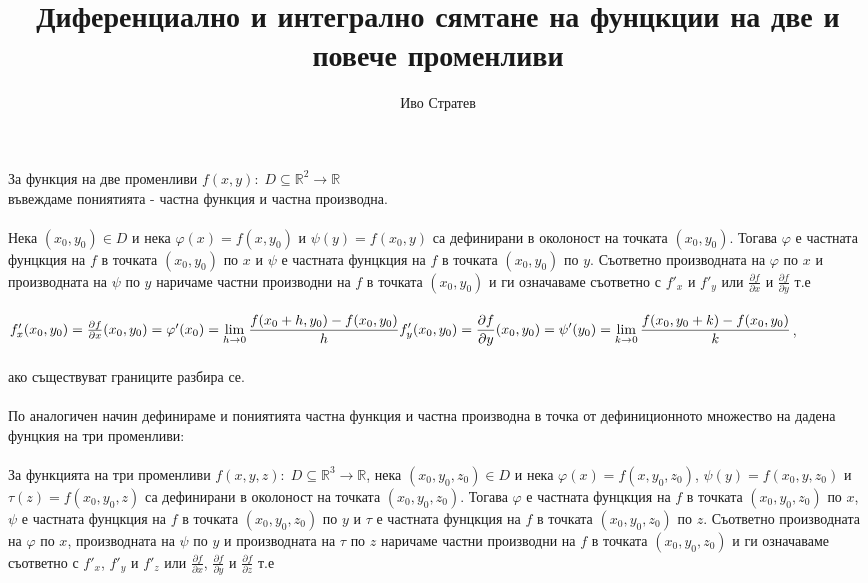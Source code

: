 \documentclass[14pt]{extarticle}
\title{Диференциално и интегрално сямтане на фунцкции на две и повече променливи}
\author{Иво Стратев}
\newcommand{\R}{\mathbb{R}}
\newcommand{\Lim}[2]{\displaystyle\lim_{#1 \to #2}}
\begin{document}
\maketitle
За функция на две променливи \(f(x, y) : \; D \subseteq \R^2 \to \R\) \\
въвеждаме пониятията - частна функция и частна производна. \\\\
Нека \((x_0, y_0) \in D\) и нека \(\varphi(x) = f(x, y_0)\) и \(\psi(y) = f(x_0, y)\) са дефинирани в околоност на точката \((x_0, y_0)\). Тогава \(\varphi\) е частната фунцкция на \(f\) в 
точката \((x_0, y_0)\) по \(x\) и \(\psi\) е частната фунцкция на \(f\) в точката \((x_0, y_0)\) по \(y\). Съответно производната на \(\varphi\) по \(x\) и
производната на \(\psi\) по \(y\) наричаме частни производни на \(f\) в точката \((x_0, y_0)\) и ги означаваме съответно с \(f'_x\) и \(f'_y\) или \(\frac{\partial f}{\partial x}\) и \(\frac{\partial f}{\partial y}\)  т.е \\\\
\(f'_x(x_0, y_0) = \frac{\partial f}{\partial x}(x_0, y_0) = \varphi'(x_0) = \Lim{h}{0} \frac{f(x_0 + h, y_0) - f(x_0, y_0)}{h} \\\\
f'_y(x_0, y_0) = \frac{\partial f}{\partial y}(x_0, y_0) = \psi'(y_0) = \Lim{k}{0} \frac{f(x_0, y_0 + k) - f(x_0, y_0)}{k} \), \\\\
ако съществуват границите разбира се. \\\\
По аналогичен начин дефинираме и пониятията частна функция и частна производна в точка от дефиниционното множество на дадена фунцкия на три променливи: \\\\
За функцията на три променливи \(f(x, y, z) : \; D \subseteq \R^3 \to \R\), 
нека \((x_0, y_0, z_0) \in D\) и нека \(\varphi(x) = f(x, y_0, z_0)\), \(\psi(y) = f(x_0, y, z_0)\) и \(\tau(z) = f(x_0, y_0, z)\)  са дефинирани в околоност на точката \((x_0, y_0, z_0)\). Тогава \(\varphi\) е частната фунцкция на \(f\) в 
точката \((x_0, y_0, z_0)\) по \(x\), \(\psi\) е частната фунцкция на \(f\) в точката \((x_0, y_0, z_0)\) по \(y\) и \(\tau\) е частната фунцкция на \(f\) в точката \((x_0, y_0, z_0)\) по \(z\). Съответно производната на \(\varphi\) по \(x\), производната на \(\psi\) по \(y\) и производната на \(\tau\) по \(z\) наричаме частни производни на \(f\) в точката \((x_0, y_0, z_0)\) и ги означаваме съответно с \(f'_x\), \(f'_y\) и \(f'_z\) или \(\frac{\partial f}{\partial x}\), \(\frac{\partial f}{\partial y}\) и \(\frac{\partial f}{\partial z}\)  т.е \\\\
\end{document}
